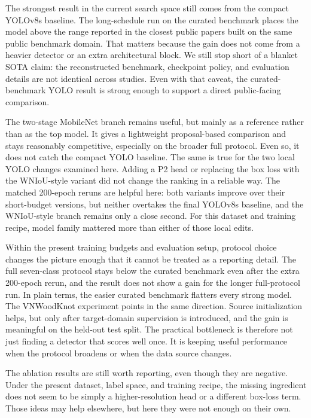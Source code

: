 \documentclass[10pt,a4paper]{article}
\begin{document}
The strongest result in the current search space still comes from the compact YOLOv8s baseline. The long-schedule run on the curated benchmark places the model above the range reported in the closest public papers built on the same public benchmark domain. That matters because the gain does not come from a heavier detector or an extra architectural block. We still stop short of a blanket SOTA claim: the reconstructed benchmark, checkpoint policy, and evaluation details are not identical across studies. Even with that caveat, the curated-benchmark YOLO result is strong enough to support a direct public-facing comparison.

The two-stage MobileNet branch remains useful, but mainly as a reference rather than as the top model. It gives a lightweight proposal-based comparison and stays reasonably competitive, especially on the broader full protocol. Even so, it does not catch the compact YOLO baseline. The same is true for the two local YOLO changes examined here. Adding a P2 head or replacing the box loss with the WNIoU-style variant did not change the ranking in a reliable way. The matched 200-epoch reruns are helpful here: both variants improve over their short-budget versions, but neither overtakes the final YOLOv8s baseline, and the WNIoU-style branch remains only a close second. For this dataset and training recipe, model family mattered more than either of those local edits.

Within the present training budgets and evaluation setup, protocol choice changes the picture enough that it cannot be treated as a reporting detail. The full seven-class protocol stays below the curated benchmark even after the extra 200-epoch rerun, and the result does not show a gain for the longer full-protocol run. In plain terms, the easier curated benchmark flatters every strong model. The VNWoodKnot experiment points in the same direction. Source initialization helps, but only after target-domain supervision is introduced, and the gain is meaningful on the held-out test split. The practical bottleneck is therefore not just finding a detector that scores well once. It is keeping useful performance when the protocol broadens or when the data source changes.

The ablation results are still worth reporting, even though they are negative. Under the present dataset, label space, and training recipe, the missing ingredient does not seem to be simply a higher-resolution head or a different box-loss term. Those ideas may help elsewhere, but here they were not enough on their own.
\end{document}
